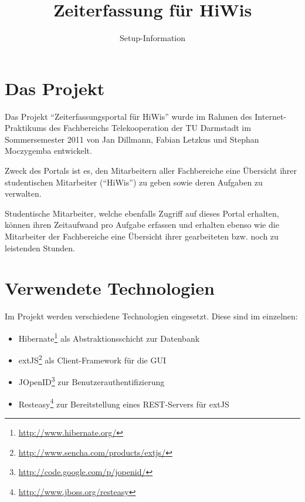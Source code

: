 \documentclass[article,colorback,accentcolor=tud2c]{tudreport}
\title{Zeiterfassung für HiWis}
\subtitle{Setup-Information}
\begin{document}
\maketitle

\tableofcontents

\newpage

\section{Das Projekt} %
\label{sec:das_projekt}

Das Projekt ``Zeiterfassungsportal für HiWis'' wurde im Rahmen des Internet-Praktikums des Fachbereichs Telekooperation der TU Darmstadt im Sommersemester 2011 von Jan Dillmann, Fabian Letzkus und Stephan Moczygemba entwickelt.

Zweck des Portals ist es, den Mitarbeitern aller Fachbereiche eine Übersicht ihrer studentischen Mitarbeiter (``HiWis'') zu geben sowie deren Aufgaben zu verwalten.

Studentische Mitarbeiter, welche ebenfalls Zugriff auf dieses Portal erhalten, können ihren Zeitaufwand pro Aufgabe erfassen und erhalten ebenso wie die Mitarbeiter der Fachbereiche eine Übersicht ihrer gearbeiteten bzw. noch zu leistenden Stunden.


\section{Verwendete Technologien} %
\label{sec:verwendete_technologien}

Im Projekt werden verschiedene Technologien eingesetzt. Diese sind im einzelnen:

\begin{itemize}
    \item Hibernate\footnote{\url{http://www.hibernate.org/}} als Abstraktionsschicht zur Datenbank
    \item extJS\footnote{\url{http://www.sencha.com/products/extjs/}} als Client-Framework für die GUI
    \item JOpenID\footnote{\url{http://code.google.com/p/jopenid/}} zur Benutzerauthentifizierung
    \item Resteasy\footnote{\url{http://www.jboss.org/resteasy}} zur Bereitstellung eines REST-Servers für extJS
\end{itemize}

\end{document}
